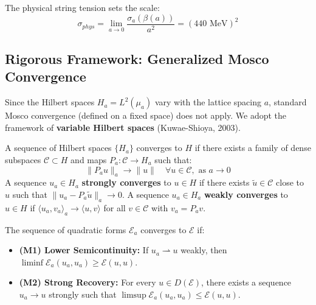 \begin{definition}
The physical string tension sets the scale:
\begin{equation}
\sigma_{phys} = \lim_{a \to 0} \frac{\sigma_a(\beta(a))}{a^2} = (440 \text{ MeV})^2
\end{equation}
\end{definition}

\subsection{Rigorous Framework: Generalized Mosco Convergence}

Since the Hilbert spaces $H_a = L^2(\mu_a)$ vary with the lattice spacing $a$, standard Mosco convergence (defined on a fixed space) does not apply. We adopt the framework of \textbf{variable Hilbert spaces} (Kuwae-Shioya, 2003).

\begin{definition}
A sequence of Hilbert spaces $\{H_a\}$ converges to $H$ if there exists a family of dense subspaces $\mathcal{C} \subset H$ and maps $P_a: \mathcal{C} \to H_a$ such that:
\begin{equation}
\|P_a u\|_a \to \|u\| \quad \forall u \in \mathcal{C}, \text{ as } a \to 0
\end{equation}
A sequence $u_a \in H_a$ \textbf{strongly converges} to $u \in H$ if there exists $\tilde{u} \in \mathcal{C}$ close to $u$ such that $\|u_a - P_a \tilde{u}\|_a \to 0$.
A sequence $u_a \in H_a$ \textbf{weakly converges} to $u \in H$ if $\langle u_a, v_a \rangle_a \to \langle u, v \rangle$ for all $v \in \mathcal{C}$ with $v_a = P_a v$.
\end{definition}

\begin{definition}
The sequence of quadratic forms $\mathcal{E}_a$ converges to $\mathcal{E}$ if:
\begin{itemize}
    \item \textbf{(M1) Lower Semicontinuity:} If $u_a \rightharpoonup u$ weakly, then $\liminf \mathcal{E}_a(u_a, u_a) \geq \mathcal{E}(u, u)$.
    \item \textbf{(M2) Strong Recovery:} For every $u \in D(\mathcal{E})$, there exists a sequence $u_a \to u$ strongly such that $\limsup \mathcal{E}_a(u_a, u_a) \leq \mathcal{E}(u, u)$.
\end{itemize}
\end{definition}

